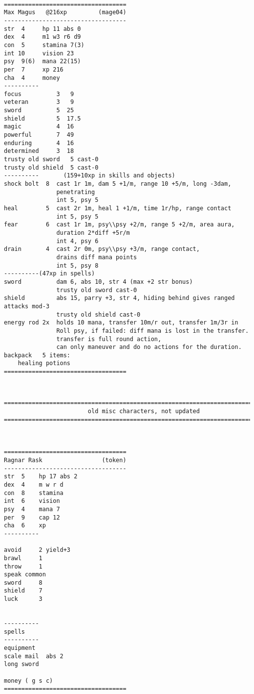 \

\goodbreak
\tiny \begin{samepage} \begin{verbatim}
===================================
Max Magus   @216xp         (mage04)
-----------------------------------
str  4     hp 11 abs 0
dex  4     m1 w3 r6 d9
con  5     stamina 7(3)
int 10     vision 23
psy  9(6)  mana 22(15)
per  7     xp 216
cha  4     money
----------
focus          3   9
veteran        3   9
sword          5  25
shield         5  17.5
magic          4  16
powerful       7  49
enduring       4  16
determined     3  18
trusty old sword   5 cast-0
trusty old shield  5 cast-0
----------       (159+10xp in skills and objects)
shock bolt  8  cast 1r 1m, dam 5 +1/m, range 10 +5/m, long -3dam,
               penetrating
               int 5, psy 5
heal        5  cast 2r 1m, heal 1 +1/m, time 1r/hp, range contact
               int 5, psy 5
fear        6  cast 1r 1m, psy\\psy +2/m, range 5 +2/m, area aura,
               duration 2*diff +5r/m
               int 4, psy 6
drain       4  cast 2r 0m, psy\\psy +3/m, range contact,
               drains diff mana points
               int 5, psy 8
----------(47xp in spells)
sword          dam 6, abs 10, str 4 (max +2 str bonus)
               trusty old sword cast-0
shield         abs 15, parry +3, str 4, hiding behind gives ranged attacks mod-3
               trusty old shield cast-0
energy rod 2x  holds 10 mana, transfer 10m/r out, transfer 1m/3r in
               Roll psy, if failed: diff mana is lost in the transfer.
               transfer is full round action,
               can only maneuver and do no actions for the duration.
backpack   5 items:
    healing potions
===================================
\end{verbatim} \end{samepage} \normalsize


\

\goodbreak
\tiny \begin{samepage} \begin{verbatim}
================================================================================
                        old misc characters, not updated
================================================================================



===================================
Ragnar Rask                 (token)
-----------------------------------
str  5    hp 17 abs 2
dex  4    m w r d
con  8    stamina
int  6    vision
psy  4    mana 7
per  9    cap 12
cha  6    xp
----------

avoid     2 yield+3
brawl     1
throw     1
speak common
sword     8
shield    7
luck      3


----------
spells
----------
equipment
scale mail  abs 2
long sword

money ( g s c)
===================================
\end{verbatim} \end{samepage} \normalsize


